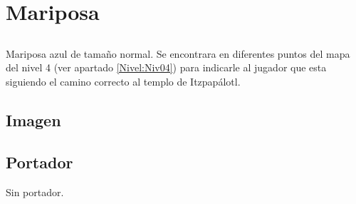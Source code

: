 	\section{Mariposa} \label{item:Mariposa}
		\subsection{}
		Mariposa azul de tamaño normal. Se encontrara en diferentes puntos del mapa del nivel 4 (ver apartado \ref{Nivel:Niv04})  para indicarle al jugador que esta siguiendo el camino correcto al templo de Itzpapálotl.
		\subsection{Imagen}
	\subsection{Portador}
	Sin portador. 